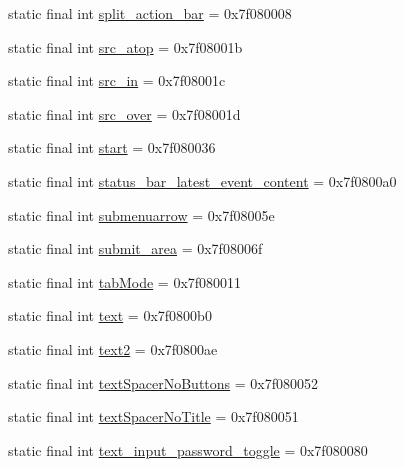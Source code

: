 \begin{CompactItemize}
static final int \hyperlink{classandroid_1_1support_1_1transition_1_1_r_1_1id_51a5bc2b098c781a2fb951150fa9f4b1}{split\_\-action\_\-bar} = 0x7f080008
\item 
static final int \hyperlink{classandroid_1_1support_1_1transition_1_1_r_1_1id_cc03b5493e724f83db7bd41d6265e546}{src\_\-atop} = 0x7f08001b
\item 
static final int \hyperlink{classandroid_1_1support_1_1transition_1_1_r_1_1id_56c2bd0d9e2c21a0a38885cb649e86d5}{src\_\-in} = 0x7f08001c
\item 
static final int \hyperlink{classandroid_1_1support_1_1transition_1_1_r_1_1id_c72ee5a1158cd7e45bc745ac823c3861}{src\_\-over} = 0x7f08001d
\item 
static final int \hyperlink{classandroid_1_1support_1_1transition_1_1_r_1_1id_d3c7bffc754c0eb2c0e1f6e4e6913cdc}{start} = 0x7f080036
\item 
static final int \hyperlink{classandroid_1_1support_1_1transition_1_1_r_1_1id_55aaca1e2008de7fa1ed9766331bd4f2}{status\_\-bar\_\-latest\_\-event\_\-content} = 0x7f0800a0
\item 
static final int \hyperlink{classandroid_1_1support_1_1transition_1_1_r_1_1id_76b59c51b9c99da5b0374c7eed75437f}{submenuarrow} = 0x7f08005e
\item 
static final int \hyperlink{classandroid_1_1support_1_1transition_1_1_r_1_1id_6bb737725f4169f461410f6b71933bed}{submit\_\-area} = 0x7f08006f
\item 
static final int \hyperlink{classandroid_1_1support_1_1transition_1_1_r_1_1id_70a43b2ad93847259d0ff439664e0b29}{tabMode} = 0x7f080011
\item 
static final int \hyperlink{classandroid_1_1support_1_1transition_1_1_r_1_1id_61829ed6bd9261ef6b4531ecf5eb8f7f}{text} = 0x7f0800b0
\item 
static final int \hyperlink{classandroid_1_1support_1_1transition_1_1_r_1_1id_aa271873f4763a8a262be52f5e553420}{text2} = 0x7f0800ae
\item 
static final int \hyperlink{classandroid_1_1support_1_1transition_1_1_r_1_1id_d6220f0e56cdc89154e0de93d1148d53}{textSpacerNoButtons} = 0x7f080052
\item 
static final int \hyperlink{classandroid_1_1support_1_1transition_1_1_r_1_1id_bc13855eb7631f9ed5d6b93482ecaebe}{textSpacerNoTitle} = 0x7f080051
\item 
static final int \hyperlink{classandroid_1_1support_1_1transition_1_1_r_1_1id_77c008faeda32b2c50009e18cdc1bdff}{text\_\-input\_\-password\_\-toggle} = 0x7f080080

\end{CompactItemize}
